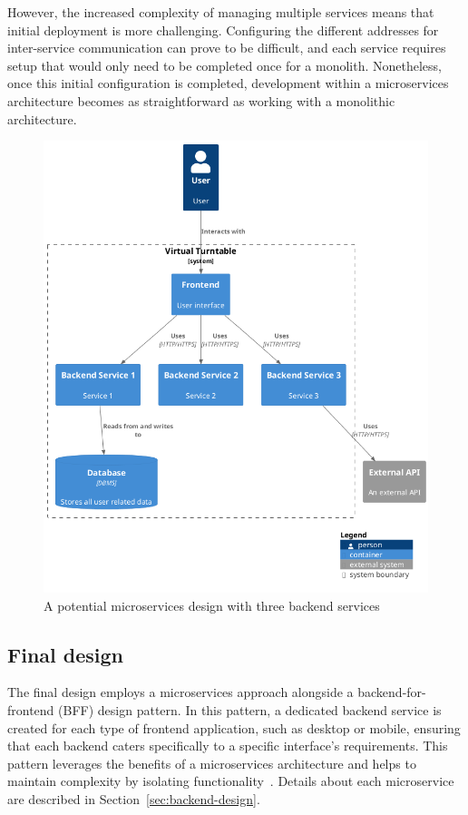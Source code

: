 However, the increased complexity of managing multiple services means that initial deployment is more challenging. Configuring the different addresses for inter-service communication can prove to be difficult, and each service requires setup that would only need to be completed once for a monolith. Nonetheless, once this initial configuration is completed, development within a microservices architecture becomes as straightforward as working with a monolithic architecture.

\begin{figure} [H]
    \centering
    \includegraphics[width=0.5\linewidth]{figures/microservices_arch.png}
    \caption{A potential microservices design with three backend services}
    \label{fig:microservices-arch}
\end{figure}

\subsection{Final design}
The final design employs a microservices approach alongside a backend-for-frontend (BFF) design pattern. In this pattern, a dedicated backend service is created for each type of frontend application, such as desktop or mobile, ensuring that each backend caters specifically to a specific interface’s requirements. This pattern leverages the benefits of a microservices architecture and helps to maintain complexity by isolating functionality~\cite{BFF}. Details about each microservice are described in Section~\ref{sec:backend-design}.

